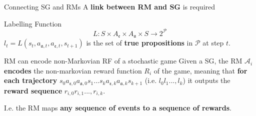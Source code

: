 \documentclass[10pt, aspectratio=169]{beamer}
\newcommand{\evidenzia}[1]{\textcolor{verdeSalvia}{\textbf{#1}}}
\begin{document}
\begin{frame}{Connecting SG and RMs}
    A \evidenzia{link between RM and SG} is required %
    \vspace{0.2cm}
    
    \begin{block}{Labelling Function}
        \[L: S \times A_{\mathfrak{e}} \times A_{\mathfrak{a}} \times S \rightarrow 2^{\mathcal{P}}\]
        $l_t = L(s_t, a_{\mathfrak{a},t}, a_{\mathfrak{e},t}, s_{t+1})$ is the set of \evidenzia{true propositions} in $\mathcal{P}$ at step $t$.
    \end{block}
    \vspace{0.2cm}
    \begin{block}{RM can encode non-Markovian RF of a stochastic game}
    Given a SG, the RM $\mathcal{A}_i$ \evidenzia{encodes} the non-markovian reward function $R_i$ of the game, meaning that \evidenzia{for each trajectory}
    $s_{0}a_{\mathfrak{e},0}a_{\mathfrak{a},0}s_{1}...s_{k}a_{\mathfrak{e},k}a_{\mathfrak{a},k}s_{k+1}$ (i.e. $l_0l_1...,l_k$) it outputs the \evidenzia{reward sequence} $r_{i,0}r_{i,1}...,r_{i,k}$.
    \end{block}
    \vspace{0.2cm}
    I.e. the RM maps \evidenzia{any sequence of events to a sequence of rewards}.
    
\end{frame}
\end{document}
